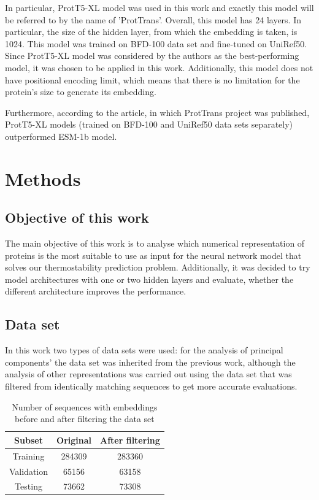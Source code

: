 \documentclass[12pt]{article}
\begin{document}
	In particular, ProtT5-XL model was used in this work and 
	exactly this model will be referred to by the name of 
	'ProtTrans'. Overall, this model has 24 layers. In particular, 
	the size of the hidden layer, from which the 
	embedding is taken, is 1024. This model was trained on 
	BFD-100 data set 
	and fine-tuned on UniRef50. Since ProtT5-XL model was 
	considered by the 
	authors as the best-performing model, it was chosen to be 
	applied in this work. Additionally, this model 
	does not have 
	positional encoding limit, which means that there is no 
	limitation for the protein's size to generate its embedding. 

	Furthermore, according to the article, in which ProtTrans
	project was published, ProtT5-XL models (trained on BFD-100 
	and UniRef50 data sets separately) 
	outperformed ESM-1b \cite{rives2021biological} model.

	\newpage

	\section{Methods}

	\subsection{Objective of this work}

	The main objective of this work is to analyse 
	which numerical representation of proteins is the most 
	suitable to use as input for the neural network 
	model that solves our thermostability prediction problem. 
	Additionally, it was decided to try model 
	architectures with one or two hidden layers and evaluate, 
	whether the different architecture improves the 
	performance.

	\subsection{Data set}

	In this work two types of data sets were used: for the analysis of 
	principal components' the data set was inherited from the previous 
	work, although the analysis of other representations was carried 
	out using the data set that was filtered from identically matching 
	sequences to get more accurate evaluations.

	\begin{table}[h!]
		\caption{Number of sequences with embeddings before and after 
		filtering the data set}
		\vspace{0.2cm}
		\centering
		\begin{tabular}{ | c | c c | }
			\hline 
			Subset & Original & After filtering \\
			\hline 
			Training & 284309 & 283360 \\
			Validation & 65156 & 63158 \\
			Testing & 73662 & 73308 \\
			\hline    
		\end{tabular}
		\label{table:numberEmbeddings}
	\end{table}
\end{document}
